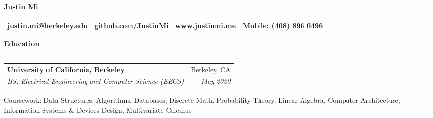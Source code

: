 \documentclass[11pt,letterpaper]{article}
\makeatletter
\newenvironment{topic}[1]
    {
    {\Large \centerline{#1}}
    \vspace*{0.03in}
    \hrule 
    \vspace*{0.05in}
    }
    {}
\newenvironment{event}
    {
    \begin{tabular*}{\textwidth}{l@{\extracolsep{\fill}}r}
    }
    {
    \end{tabular*}
    }
\newenvironment{detail}
    {
    \normalsize
    }
    {
    \vspace*{0.02in}
    }
\newenvironment{head}
    {
    \begin{center}
    \begin{tabular*}{\textwidth}{@{\extracolsep{\fill}} l c c r}
    }
    {
    \hline
    \hline
    \end{tabular*}
    \end{center}
    }
\makeatother
\begin{document}
    \begin{center}
        \huge{\textbf{Justin Mi}}
    \end{center}
    \begin{head}
    justin.mi@berkeley.edu  & github.com/JustinMi & www.justinmi.me & Mobile: (408) 896 0496 \\
    \end{head}


    \begin{topic}{\textbf{Education}}
        \begin{event}
            \textbf{University of California, Berkeley} & Berkeley, CA \\
            \emph{BS, Electrical Engineering and Computer Science (EECS)} & \emph{May 2020}        
        \end{event}
            \begin{detail}
                Coursework: Data Structures, Algorithms, Databases, Discrete Math, Probability Theory, Linear Algebra, Computer Architecture, Information Systems \& Devices Design, Multivariate Calculus            
            \end{detail}
    \end{topic} \vspace*{0.1in}
\end{document}
